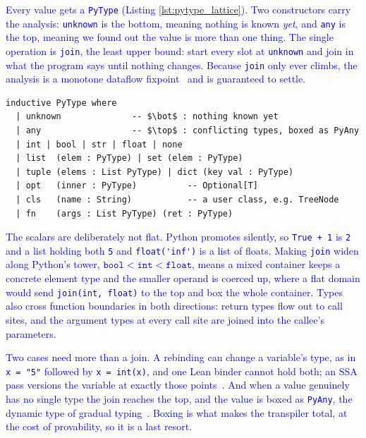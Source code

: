 \documentclass{article}
\newcommand{\code}{\lstinline}
\newcommand{\suggest}[1]{\textcolor{blue}{#1}}
\begin{document}
\suggest{Every value gets a \code{PyType} (Listing \ref{lst:pytype_lattice}). Two constructors carry the analysis: \code{unknown} is the bottom, meaning nothing is known \emph{yet}, and \code{any} is the top, meaning we found out the value is more than one thing. The single operation is \code{join}, the least upper bound: start every slot at \code{unknown} and join in what the program says until nothing changes. Because \code{join} only ever climbs, the analysis is a monotone dataflow fixpoint~\cite{cousot1977abstract} and is guaranteed to settle.}

\begin{lstlisting}[caption={The \texttt{PyType} lattice.},label={lst:pytype_lattice}, mathescape=true]
inductive PyType where
  | unknown              -- $\bot$ : nothing known yet
  | any                  -- $\top$ : conflicting types, boxed as PyAny
  | int | bool | str | float | none
  | list  (elem : PyType) | set (elem : PyType)
  | tuple (elems : List PyType) | dict (key val : PyType)
  | opt   (inner : PyType)          -- Optional[T]
  | cls   (name : String)           -- a user class, e.g. TreeNode
  | fn    (args : List PyType) (ret : PyType)
\end{lstlisting}

\suggest{The scalars are deliberately not flat. Python promotes silently, so \code{True + 1} is \code{2} and a list holding both \code{5} and \code{float('inf')} is a list of floats. Making \code{join} widen along Python's tower, $\mathtt{bool} < \mathtt{int} < \mathtt{float}$, means a mixed container keeps a concrete element type and the smaller operand is coerced up, where a flat domain would send \code{join(int, float)} to the top and box the whole container. Types also cross function boundaries in both directions: return types flow out to call sites, and the argument types at every call site are joined into the callee's parameters.}

\suggest{Two cases need more than a join. A rebinding can change a variable's type, as in \code{x = "5"} followed by \code{x = int(x)}, and one Lean binder cannot hold both; an SSA pass versions the variable at exactly those points~\cite{cytron1991ssa}. And when a value genuinely has no single type the join reaches the top, and the value is boxed as \code{PyAny}, the dynamic type of gradual typing~\cite{siek2006gradual}. Boxing is what makes the transpiler total, at the cost of provability, so it is a last resort.}
\end{document}
